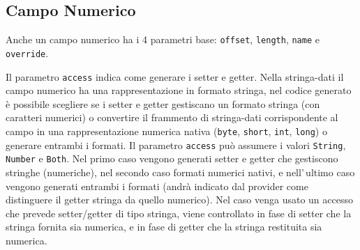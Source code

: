 \documentclass[a4paper,10pt]{report}
\begin{document}
\subsection{Campo Numerico}
Anche un campo numerico ha i 4 parametri base: \verb!offset!, \verb!length!,
\verb!name! e \verb!override!.

Il parametro \verb!access! indica come generare i setter e getter.
Nella stringa-dati il campo numerico ha una rappresentazione in formato stringa,
nel codice generato è possibile scegliere se i setter e getter gestiscano un
formato stringa (con caratteri numerici) o convertire il frammento di 
stringa-dati corrispondente al campo in una rappresentazione numerica nativa 
(\verb!byte!, \verb!short!, \verb!int!, \verb!!\verb!long!) o generare entrambi 
i formati.
Il parametro \verb!access! può assumere i valori \verb!String!, \verb!Number! e 
\verb!Both!. Nel primo caso vengono generati setter e getter che gestiscono
stringhe (numeriche), nel secondo caso formati numerici nativi, e nell'\,ultimo
caso vengono generati entrambi i formati (andrà indicato dal provider come
distinguere il getter stringa da quello numerico).
Nel caso venga usato un accesso che prevede setter/getter di tipo stringa,
viene controllato in fase di setter che la stringa fornita sia numerica,
e in fase di getter che la stringa restituita sia numerica.
\end{document}
